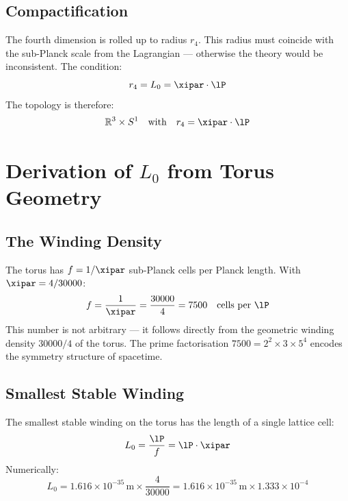 \subsection{Compactification}

The fourth dimension is rolled up to radius $r_4$. This radius must coincide with the sub-Planck scale from the Lagrangian — otherwise the theory would be inconsistent. The condition:
\begin{equation}
	r_4 = L_0 = \xipar \cdot \lP
\end{equation}
The topology is therefore:
\begin{equation}
	\mathbb{R}^3 \times S^1 \quad \text{with} \quad r_4 = \xipar \cdot \lP
\end{equation}

\section{Derivation of \texorpdfstring{$L_0$}{L0} from Torus Geometry}

\subsection{The Winding Density}

The torus has $f = 1/\xipar$ sub-Planck cells per Planck length. With $\xipar = 4/30000$:
\begin{equation}
	f = \frac{1}{\xipar} = \frac{30000}{4} = 7500 \quad \text{cells per } \lP
\end{equation}
This number is not arbitrary — it follows directly from the geometric winding density $30000/4$ of the torus. The prime factorisation $7500 = 2^2 \times 3 \times 5^4$ encodes the symmetry structure of spacetime.

\subsection{Smallest Stable Winding}

The smallest stable winding on the torus has the length of a single lattice cell:
\begin{equation}
	L_0 = \frac{\lP}{f} = \lP \cdot \xipar
\end{equation}
Numerically:
\begin{equation}
	L_0 = 1{.}616 \times 10^{-35}\,\text{m} \times \frac{4}{30000} = 1{.}616 \times 10^{-35}\,\text{m} \times 1{.}333 \times 10^{-4}
\end{equation}

